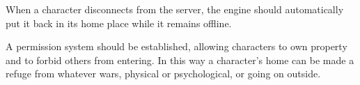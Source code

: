 When a character disconnects from the server, the engine should automatically
put it back in its home place while it remains offline.

A permission system should be established, allowing characters to own
property and to forbid others from entering.
In this way a character's home can be made a refuge from whatever wars,
physical or psychological, or going on outside.
